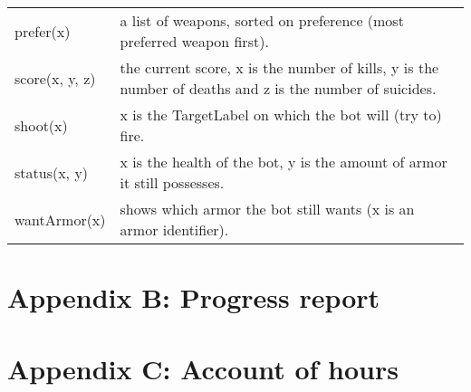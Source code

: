 \begin{tabular}{ l | p{12cm}}
  prefer(x) & a list of weapons, sorted on preference (most preferred weapon first). \\
  score(x, y, z) & the current score, x is the number of kills, y is the number of deaths and z is the number of suicides. \\
  shoot(x) & x is the TargetLabel on which the bot will (try to) fire. \\
  status(x, y) & x is the health of the bot, y is the amount of armor it still possesses. \\
  wantArmor(x) & shows which armor the bot still wants (x is an armor identifier). \\
\end{tabular}
	
	
\chapter*{Appendix B: Progress report}
	
	
\chapter*{Appendix C: Account of hours}
	